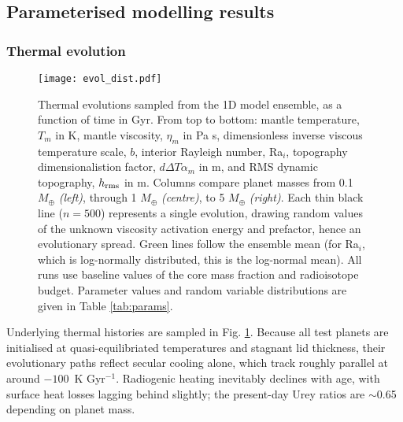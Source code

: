 \subsection{Parameterised modelling results}



\subsubsection{Thermal evolution}

\begin{figure}
    \centering
    \texttt{[image: evol\_dist.pdf]}
    \caption[Thermal evolutions sampled from the 1D model ensemble, as a function of time in Gyr.]{Thermal evolutions sampled from the 1D model ensemble, as a function of time in Gyr. From top to bottom: mantle temperature, $T_m$ in K, mantle viscosity, $\eta_m$ in Pa s, dimensionless inverse viscous temperature scale, $b$, interior Rayleigh number, Ra$_i$, topography dimensionalistion factor, $d \Delta T \alpha_m$ in m, and RMS dynamic topography, $h_{\rm rms}$ in m. Columns compare planet masses from 0.1 $M_\oplus$ \textit{(left)}, through 1 $M_\oplus$ \textit{(centre)}, to 5 $M_\oplus$ \textit{(right)}. Each thin black line ($n = 500$) represents a single evolution, drawing random values of the unknown viscosity activation energy and prefactor, hence an evolutionary spread. Green lines follow the ensemble mean (for Ra$_i$, which is log-normally distributed, this is the log-normal mean). All runs use baseline values of the core mass fraction and radioisotope budget. Parameter values and random variable distributions are given in Table \ref{tab:params}.}
    \label{fig:1D-evolution}
\end{figure}




Underlying thermal histories are sampled in Fig. \ref{fig:1D-evolution}. Because all test planets are initialised at quasi-equilibriated temperatures and stagnant lid thickness, their evolutionary paths reflect secular cooling alone, which track roughly parallel at around $-100$~K Gyr$^{-1}$. Radiogenic heating inevitably declines with age, with surface heat losses lagging behind slightly; the present-day Urey ratios are $\sim$0.65 depending on planet mass. 

